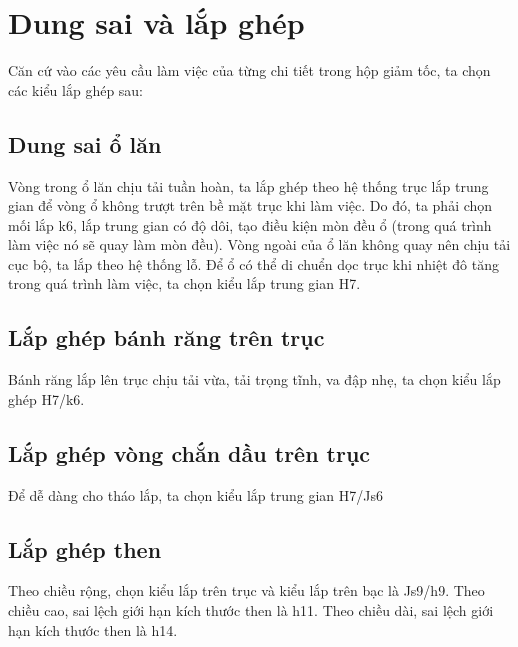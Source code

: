 \chapter{Dung sai và lắp ghép}
Căn cứ vào các yêu cầu làm việc của từng chi tiết trong hộp giảm tốc, ta chọn các
kiểu lắp ghép sau:
\section{Dung sai ổ lăn}
Vòng trong ổ lăn chịu tải tuần hoàn, ta lắp ghép theo hệ thống trục lắp trung gian để
vòng ổ không trượt trên bề mặt trục khi làm việc. Do đó, ta phải chọn mối lắp k6, lắp
trung gian có độ dôi, tạo điều kiện mòn đều ổ (trong quá trình làm việc nó sẽ quay làm
mòn đều).
Vòng ngoài của ổ lăn không quay nên chịu tải cục bộ, ta lắp theo hệ thống lỗ. Để ổ có
thể di chuển dọc trục khi nhiệt đô tăng trong quá trình làm việc, ta chọn kiểu lắp trung
gian H7.
\section{Lắp ghép bánh răng trên trục}
Bánh răng lắp lên trục chịu tải vừa, tải trọng tĩnh, va đập nhẹ, ta chọn kiểu lắp ghép
H7/k6.
\section{Lắp ghép vòng chắn dầu trên trục}
Để dễ dàng cho tháo lắp, ta chọn kiểu lắp trung gian H7/Js6
\section{Lắp ghép then}
Theo chiều rộng, chọn kiểu lắp trên trục và kiểu lắp trên bạc là Js9/h9.
Theo chiều cao, sai lệch giới hạn kích thước then là h11.
Theo chiều dài, sai lệch giới hạn kích thước then là h14.

